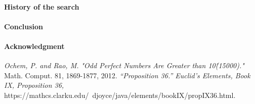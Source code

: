 \documentclass[12pt]{article}
\begin{document}
\paragraph*{History of the search}
	
\paragraph*{Conclusion}

\paragraph*{Acknowledgment}


\begin{thebibliography}{5}
		\textit{Ochem, P. and Rao, M. "Odd Perfect Numbers Are Greater than 10\^(15000)."} Math. Comput. 81, 1869-1877, 2012.
		\textit{“Proposition 36.” Euclid's Elements, Book IX, Proposition 36,} https://mathcs.clarku.edu/~djoyce/java/elements/bookIX/propIX36.html.
\end{thebibliography}
\end{document}
